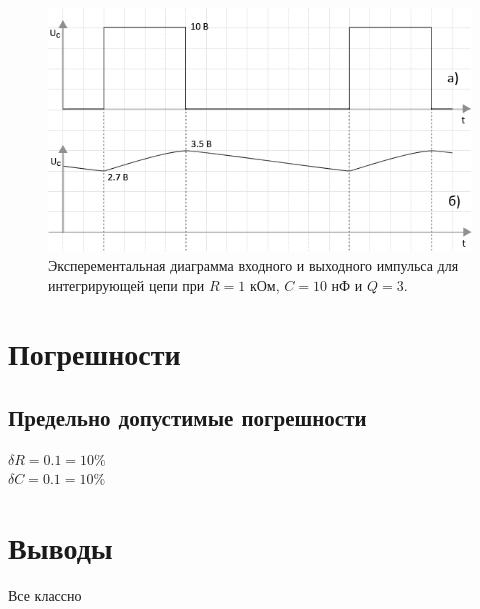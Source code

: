 \begin{figure}[H]
	\begin{center}
		\includegraphics[width=14cm]{img/q3}
		\caption{Эксперементальная диаграмма входного и выходного импульса для интегрирующей цепи при $R = 1$ кОм, $C = 10$ нФ и $Q = 3$.}
		\label{t:2} %
	\end{center}
\end{figure}

\section{Погрешности}

\subsection{Предельно допустимые погрешности}
\begin{center}
$\delta R = 0.1 = 10\%$\\
$\delta C = 0.1 = 10\%$\\
\end{center}

  
\section{Выводы}
Все классно


